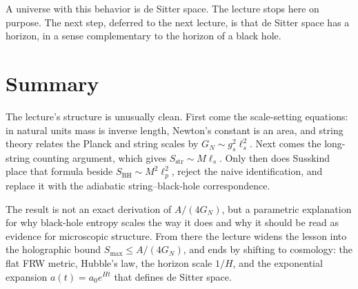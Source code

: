 A universe with this behavior is de Sitter space. The lecture stops here on purpose. The next step, deferred to the next lecture, is that de Sitter space has a horizon, in a sense complementary to the horizon of a black hole.

\section{Summary}

The lecture's structure is unusually clean. First come the scale-setting equations: in natural units mass is inverse length, Newton's constant is an area, and string theory relates the Planck and string scales by \(G_N \sim g_s^2\ell_s^2\). Next comes the long-string counting argument, which gives \(S_{\mathrm{str}} \sim M\ell_s\). Only then does Susskind place that formula beside \(S_{\mathrm{BH}} \sim M^2\ell_p^2\), reject the naive identification, and replace it with the adiabatic string--black-hole correspondence.

The result is not an exact derivation of \(A/(4G_N)\), but a parametric explanation for why black-hole entropy scales the way it does and why it should be read as evidence for microscopic structure. From there the lecture widens the lesson into the holographic bound \(S_{\max}\le A/(4G_N)\), and ends by shifting to cosmology: the flat FRW metric, Hubble's law, the horizon scale \(1/H\), and the exponential expansion \(a(t)=a_0e^{Ht}\) that defines de Sitter space.